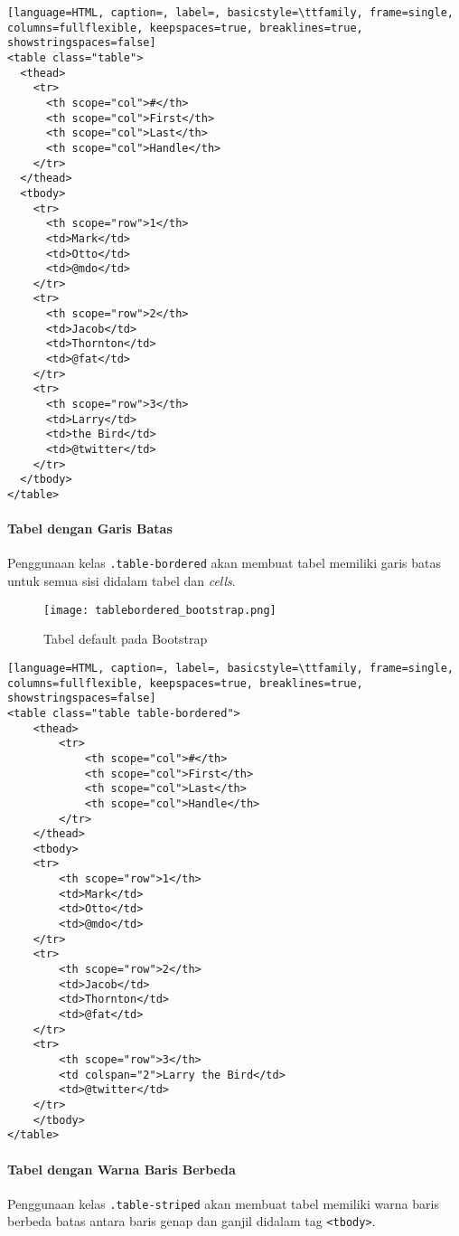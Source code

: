 \begin{lstlisting}[language=HTML, caption=, label=, basicstyle=\ttfamily, frame=single, columns=fullflexible, keepspaces=true, breaklines=true, showstringspaces=false] 
<table class="table">
  <thead>
    <tr>
      <th scope="col">#</th>
      <th scope="col">First</th>
      <th scope="col">Last</th>
      <th scope="col">Handle</th>
    </tr>
  </thead>
  <tbody>
    <tr>
      <th scope="row">1</th>
      <td>Mark</td>
      <td>Otto</td>
      <td>@mdo</td>
    </tr>
    <tr>
      <th scope="row">2</th>
      <td>Jacob</td>
      <td>Thornton</td>
      <td>@fat</td>
    </tr>
    <tr>
      <th scope="row">3</th>
      <td>Larry</td>
      <td>the Bird</td>
      <td>@twitter</td>
    </tr>
  </tbody>
</table>
\end{lstlisting}

\paragraph{Tabel dengan Garis Batas}
Penggunaan kelas \texttt{.table-bordered} akan membuat tabel memiliki garis batas untuk semua sisi didalam tabel dan \textit{cells}.

\begin{figure} [H]
	\centering  
	\texttt{[image: tablebordered\_bootstrap.png]}  
	\caption{Tabel default pada Bootstrap} 
\end{figure}

\begin{lstlisting}[language=HTML, caption=, label=, basicstyle=\ttfamily, frame=single, columns=fullflexible, keepspaces=true, breaklines=true, showstringspaces=false] 
<table class="table table-bordered">
	<thead>
		<tr>
			<th scope="col">#</th>
			<th scope="col">First</th>
			<th scope="col">Last</th>
			<th scope="col">Handle</th>
		</tr>
	</thead>
	<tbody>
	<tr>
		<th scope="row">1</th>
		<td>Mark</td>
		<td>Otto</td>
		<td>@mdo</td>
	</tr>
	<tr>
		<th scope="row">2</th>
		<td>Jacob</td>
		<td>Thornton</td>
		<td>@fat</td>
	</tr>
	<tr>
		<th scope="row">3</th>
		<td colspan="2">Larry the Bird</td>
		<td>@twitter</td>
	</tr>
	</tbody>
</table>
\end{lstlisting}

\paragraph{Tabel dengan Warna Baris Berbeda}
Penggunaan kelas \texttt{.table-striped} akan membuat tabel memiliki warna baris berbeda batas antara baris genap dan ganjil didalam tag \texttt{<tbody>}.

